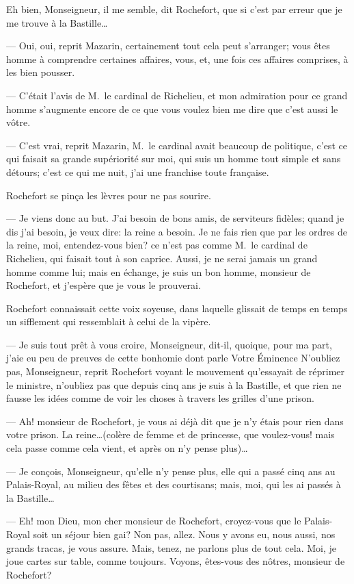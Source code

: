 Eh bien, Monseigneur, il me semble, dit Rochefort, que si c'est par erreur que je me trouve à la Bastille\dots

— Oui, oui, reprit Mazarin, certainement tout cela peut s'arranger; vous êtes homme à comprendre certaines affaires, vous, et, une fois ces affaires comprises, à les bien pousser.

— C'était l'avis de M.~le cardinal de Richelieu, et mon admiration pour ce grand homme s'augmente encore de ce que vous voulez bien me dire que c'est aussi le vôtre.

— C'est vrai, reprit Mazarin, M.~le cardinal avait beaucoup de politique, c'est ce qui faisait sa grande supériorité sur moi, qui suis un homme tout simple et sans détours; c'est ce qui me nuit, j'ai une franchise toute française.

Rochefort se pinça les lèvres pour ne pas sourire.

— Je viens donc au but. J'ai besoin de bons amis, de serviteurs fidèles; quand je dis j'ai besoin, je veux dire: la reine a besoin. Je ne fais rien que par les ordres de la reine, moi, entendez-vous bien? ce n'est pas comme M.~le cardinal de Richelieu, qui faisait tout à son caprice. Aussi, je ne serai jamais un grand homme comme lui; mais en échange, je suis un bon homme, monsieur de Rochefort, et j'espère que je vous le prouverai.

Rochefort connaissait cette voix soyeuse, dans laquelle glissait de temps en temps un sifflement qui ressemblait à celui de la vipère.

— Je suis tout prêt à vous croire, Monseigneur, dit-il, quoique, pour ma part, j'aie eu peu de preuves de cette bonhomie dont parle Votre Éminence N'oubliez pas, Monseigneur, reprit Rochefort voyant le mouvement qu'essayait de réprimer le ministre, n'oubliez pas que depuis cinq ans je suis à la Bastille, et que rien ne fausse les idées comme de voir les choses à travers les grilles d'une prison.

— Ah! monsieur de Rochefort, je vous ai déjà dit que je n'y étais pour rien dans votre prison. La reine\dots (colère de femme et de princesse, que voulez-vous! mais cela passe comme cela vient, et après on n'y pense plus)\dots

— Je conçois, Monseigneur, qu'elle n'y pense plus, elle qui a passé cinq ans au Palais-Royal, au milieu des fêtes et des courtisans; mais, moi, qui les ai passés à la Bastille\dots

— Eh! mon Dieu, mon cher monsieur de Rochefort, croyez-vous que le Palais-Royal soit un séjour bien gai? Non pas, allez. Nous y avons eu, nous aussi, nos grands tracas, je vous assure. Mais, tenez, ne parlons plus de tout cela. Moi, je joue cartes sur table, comme toujours. Voyons, êtes-vous des nôtres, monsieur de Rochefort?

